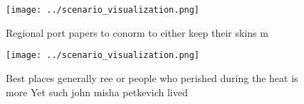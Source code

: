 \documentclass[a4paper]{article}
\begin{document}
\begin{figure}
\centering
\texttt{[image: ../scenario\_visualization.png]}
\caption{Regional port papers to conorm to either keep their skins m
}
\end{figure}
 
\begin{figure}
\centering
\texttt{[image: ../scenario\_visualization.png]}
\caption{Best places generally ree or people who perished during the heat is more Yet such john misha petkevich lived 
}
\end{figure}
 
\end{document}
